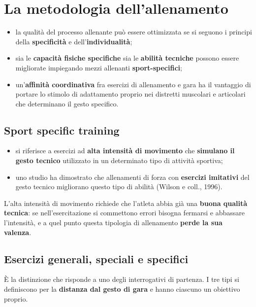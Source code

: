 \section{La metodologia dell'allenamento}

\begin{itemize}
  \item la qualità del processo allenante può essere ottimizzata se si seguono i principi della
    \textbf{specificità} e dell'\textbf{individualità};
  \item sia le \textbf{capacità fisiche specifiche} sia le \textbf{abilità tecniche} possono essere
    migliorate impiegando mezzi allenanti \textbf{sport-specifici};
  \item un'\textbf{affinità coordinativa} fra esercizi di allenamento e gara ha il vantaggio di
    portare lo stimolo di adattamento proprio nei distretti muscolari e articolari che determinano
    il gesto specifico.
\end{itemize}

\subsection{Sport specific training}

\begin{itemize}
  \item si riferisce a esercizi ad \textbf{alta intensità di movimento} che \textbf{simulano il
    gesto tecnico} utilizzato in un determinato tipo di attività sportiva;
  \item uno studio ha dimostrato che allenamenti di forza con \textbf{esercizi imitativi} del gesto
    tecnico migliorano questo tipo di abilità (Wilson e coll., 1996).
\end{itemize}

L'alta intensità di movimento richiede che l'atleta abbia già una \textbf{buona qualità tecnica}: se
nell'esercitazione si commettono errori bisogna fermarsi e abbassare l'intensità, e a quel punto
questa tipologia di allenamento \textbf{perde la sua valenza}.

\subsection{Esercizi generali, speciali e specifici}

È la distinzione che risponde a uno degli interrogativi di partenza. I tre tipi si definiscono per
la \textbf{distanza dal gesto di gara} e hanno ciascuno un obiettivo proprio.

